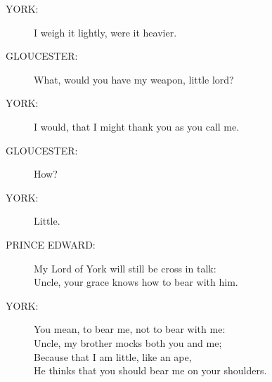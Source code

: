\documentclass{article}
\begin{document}
\begin{description}
\item[YORK:] 
\hspace{1pt}I weigh it lightly, were it heavier.\\
\end{description}
\begin{description}
\item[GLOUCESTER:] 
\hspace{1pt}What, would you have my weapon, little lord?\\
\end{description}
\begin{description}
\item[YORK:] 
\hspace{1pt}I would, that I might thank you as you call me.\\
\end{description}
\begin{description}
\item[GLOUCESTER:] 
\hspace{1pt}How?\\
\end{description}
\begin{description}
\item[YORK:] 
\hspace{1pt}Little.\\
\end{description}
\begin{description}
\item[PRINCE EDWARD:] 
\hspace{1pt}My Lord of York will still be cross in talk:\\
\hspace{1pt}Uncle, your grace knows how to bear with him.\\
\end{description}
\begin{description}
\item[YORK:] 
\hspace{1pt}You mean, to bear me, not to bear with me:\\
\hspace{1pt}Uncle, my brother mocks both you and me;\\
\hspace{1pt}Because that I am little, like an ape,\\
\hspace{1pt}He thinks that you should bear me on your shoulders.\\
\end{description}
\end{document}
